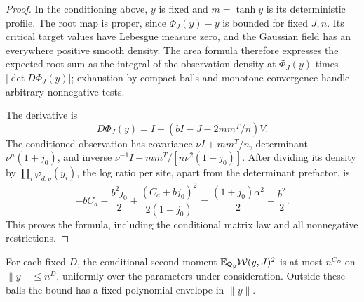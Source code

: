 \begin{proof}
In the conditioning above, $y$ is fixed and $m=\tanh y$ is its
deterministic profile. The root map is proper,
since $\Phi_J(y)-y$ is bounded for fixed $J,n$. Its critical target values
have Lebesgue measure zero, and the Gaussian field has an everywhere
positive smooth density. The area formula therefore expresses the expected
root sum as the integral of the observation density at $\Phi_J(y)$ times
$|\det D\Phi_J(y)|$; exhaustion by compact balls and monotone convergence
handle arbitrary nonnegative tests.

The derivative is
\[
 D\Phi_J(y)=I+(bI-J-2mm^T/n)V.
\]
The conditioned observation has covariance $\nu I+mm^T/n$, determinant
$\nu^n(1+j_0)$, and inverse
$\nu^{-1}I-mm^T/[n\nu^2(1+j_0)]$.
After dividing its density by $\prod_i\varphi_{d,\nu}(y_i)$, the log ratio
per site, apart from the determinant prefactor, is
\[
 -bC_a-\frac{b^2j_0}{2}
   +\frac{(C_a+bj_0)^2}{2(1+j_0)}
 =\frac{(1+j_0)\alpha^2}{2}-\frac{b^2}{2}.
\]
This proves the formula, including the conditional matrix law and all
nonnegative restrictions.
\end{proof}

\begin{lemma}\label{prof:determinant-square}
For each fixed $D$, the conditional second moment
$\mathbb E_{\mathsf Q_y}\mathcal W(y,J)^2$ is at most $n^{C_D}$ on
$\|y\|\le n^D$, uniformly over the parameters under consideration.
Outside these balls the bound has a fixed polynomial envelope in
$\|y\|$.
\end{lemma}

